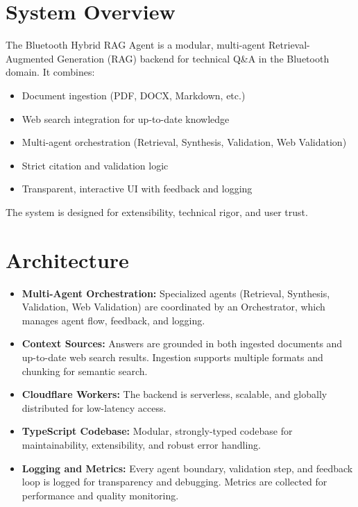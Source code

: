 \documentclass{article}
\begin{document}
\section*{System Overview}
The Bluetooth Hybrid RAG Agent is a modular, multi-agent Retrieval-Augmented Generation (RAG) backend for technical Q\&A in the Bluetooth domain. It combines:
\begin{itemize}
  \item Document ingestion (PDF, DOCX, Markdown, etc.)
  \item Web search integration for up-to-date knowledge
  \item Multi-agent orchestration (Retrieval, Synthesis, Validation, Web Validation)
  \item Strict citation and validation logic
  \item Transparent, interactive UI with feedback and logging
\end{itemize}
The system is designed for extensibility, technical rigor, and user trust.

\section*{Architecture}
\begin{itemize}[leftmargin=*, itemsep=0.5em]
  \item \textbf{Multi-Agent Orchestration:} Specialized agents (Retrieval, Synthesis, Validation, Web Validation) are coordinated by an Orchestrator, which manages agent flow, feedback, and logging.
  \item \textbf{Context Sources:} Answers are grounded in both ingested documents and up-to-date web search results. Ingestion supports multiple formats and chunking for semantic search.
  \item \textbf{Cloudflare Workers:} The backend is serverless, scalable, and globally distributed for low-latency access.
  \item \textbf{TypeScript Codebase:} Modular, strongly-typed codebase for maintainability, extensibility, and robust error handling.
  \item \textbf{Logging and Metrics:} Every agent boundary, validation step, and feedback loop is logged for transparency and debugging. Metrics are collected for performance and quality monitoring.
\end{itemize}
\end{document}
